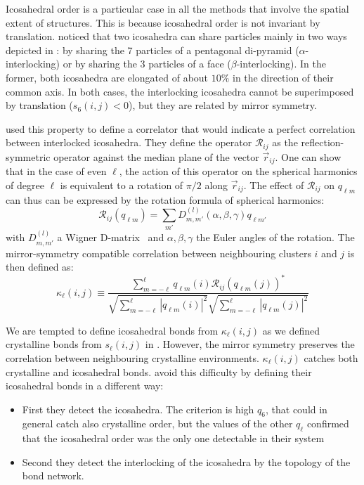 Icosahedral order is a particular case in all the methods that involve the spatial extent of structures. This is because icosahedral order is not invariant by translation. \citet{Tomida1995} noticed that two icosahedra can share particles mainly in two ways depicted in : by sharing the 7 particles of a pentagonal di-pyramid ($\alpha$-interlocking) or by sharing the 3 particles of a face ($\beta$-interlocking). In the former, both icosahedra are elongated of about $10\%$ in the direction of their common axis. In both cases, the interlocking icosahedra cannot be superimposed by translation ($s_6(i,j)<0$), but they are related by mirror symmetry. 

\citet{Tomida1995} used this property to define a correlator that would indicate a perfect correlation between interlocked icosahedra. They define the operator $\mathcal{R}_{i j}$ as the reflection-symmetric operator against the median plane of the vector $\vec{r}_{i j}$. One can show that in the case of even $\ell$, the action of this operator on the spherical harmonics of degree $\ell$ is equivalent to a rotation of $\pi/2$ along $\vec{r}_{i j}$. The effect of $\mathcal{R}_{i j}$ on $q_{\ell m}$ can thus can be expressed by the rotation formula of spherical harmonics:
\begin{equation}
	\mathcal{R}_{i j}(q_{\ell m}) = \sum_{m'} D_{m, m'}^{(l)}\left(\alpha, \beta, \gamma \right) q_{\ell m'}
	\label{eq:rotate_boo}
\end{equation}
with $D_{m, m'}^{(l)}$ a Wigner D-matrix~\citep{Wigner1960} and $\alpha, \beta, \gamma$ the Euler angles of the rotation. The mirror-symmetry compatible correlation between neighbouring clusters $i$ and $j$ is then defined as:
\begin{equation}
	\kappa_\ell(i,j) \equiv \frac{
		\sum_{m=-\ell}^{\ell} q_{\ell m}(i) \mathcal{R}_{i j}\left(q_{\ell m}(j)\right)^{*}
	}{
		\sqrt{\sum_{m=-\ell}^{\ell} |q_{\ell m}(i)|^2} \sqrt{\sum_{m=-\ell}^{\ell} |q_{\ell m}(j)|^2}
	}
	\label{eq:boo_mirror_dot}
\end{equation}

We are tempted to define icosahedral bonds from $\kappa_\ell(i,j)$ as we defined crystalline bonds from $s_\ell(i,j)$ in . However, the mirror symmetry preserves the correlation between neighbouring crystalline environments. $\kappa_\ell(i,j)$ catches both crystalline and icosahedral bonds. \citet{Tomida1995} avoid this difficulty by defining their icosahedral bonds in a different way:
\begin{itemize}
	\item First they detect the icosahedra. The criterion is high $q_6$, that could in general catch also crystalline order, but the values of the other $q_\ell$ confirmed that the icosahedral order was the only one detectable in their system
	\item Second they detect the interlocking of the icosahedra by the topology of the bond network.
\end{itemize}

